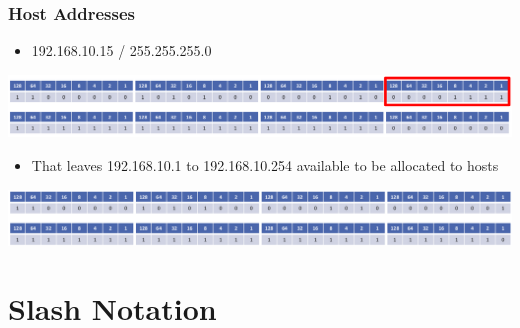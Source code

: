 \documentclass[pdflatex,compress]{beamer}
\begin{document}
\begin{frame}
	\frametitle{Host Addresses}
	\begin{itemize}
		\item 192.168.10.15 / 255.255.255.0
	\end{itemize}
	\begin{center}
		\includegraphics[width=\linewidth]{img/img33}
	\end{center}
	\begin{itemize}
		\item That leaves 192.168.10.1 to 192.168.10.254 available to be allocated
		to hosts
	\end{itemize}
	\begin{center}
		\includegraphics[width=\linewidth]{img/img34}
	\end{center}
\end{frame}

\section{Slash Notation}
\end{document}
